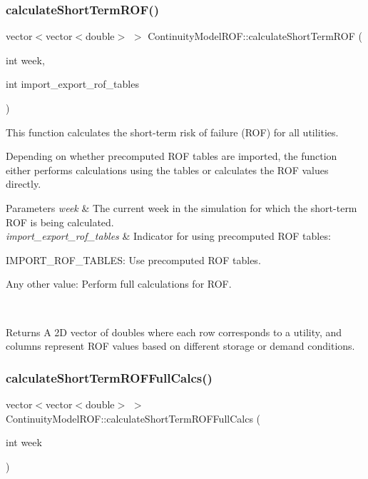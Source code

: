 \subsubsection{\texorpdfstring{calculate\+Short\+Term\+R\+O\+F()}{calculateShortTermROF()}}
{\footnotesize\ttfamily vector$<$vector$<$double$>$ $>$ Continuity\+Model\+R\+O\+F\+::calculate\+Short\+Term\+R\+OF (\begin{DoxyParamCaption}\item[{int}]{week,  }\item[{int}]{import\+\_\+export\+\_\+rof\+\_\+tables }\end{DoxyParamCaption})}



This function calculates the short-\/term risk of failure (R\+OF) for all utilities. 

Depending on whether precomputed R\+OF tables are imported, the function either performs calculations using the tables or calculates the R\+OF values directly.


\begin{DoxyParams}{Parameters}
{\em week} & The current week in the simulation for which the short-\/term R\+OF is being calculated. \\
\hline
{\em import\+\_\+export\+\_\+rof\+\_\+tables} & Indicator for using precomputed R\+OF tables\+:
\begin{DoxyItemize}
\item I\+M\+P\+O\+R\+T\+\_\+\+R\+O\+F\+\_\+\+T\+A\+B\+L\+ES\+: Use precomputed R\+OF tables.
\item Any other value\+: Perform full calculations for R\+OF.
\end{DoxyItemize}\\
\hline
\end{DoxyParams}
\begin{DoxyReturn}{Returns}
A 2D vector of doubles where each row corresponds to a utility, and columns represent R\+OF values based on different storage or demand conditions. 
\end{DoxyReturn}
\mbox{\label{classContinuityModelROF_a975e7566b4c0db6e3731647b6e76b9c8}} 
\subsubsection{\texorpdfstring{calculate\+Short\+Term\+R\+O\+F\+Full\+Calcs()}{calculateShortTermROFFullCalcs()}}
{\footnotesize\ttfamily vector$<$vector$<$double$>$ $>$ Continuity\+Model\+R\+O\+F\+::calculate\+Short\+Term\+R\+O\+F\+Full\+Calcs (\begin{DoxyParamCaption}\item[{int}]{week }\end{DoxyParamCaption})}



